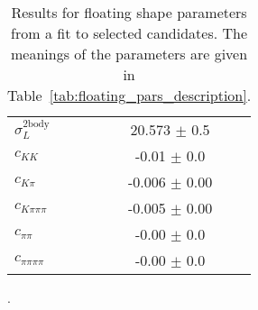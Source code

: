 \begin{table}[h]
\begin{tabular}{lc}
      $\sigma_L^\mathrm{2body}$ & 20.573 $\pm$ 0.5 \\
      $c_{KK}$ & -0.01 $\pm$ 0.0 \\
      $c_{K\pi}$ & -0.006 $\pm$ 0.00 \\
      $c_{K\pi\pi\pi}$ & -0.005 $\pm$ 0.00 \\
      $c_{\pi\pi}$ & -0.00 $\pm$ 0.0 \\
      $c_{\pi\pi\pi\pi}$ & -0.00 $\pm$ 0.0 \\
      \bottomrule
  \end{tabular}
  \caption{Results for floating shape parameters from a fit to selected candidates. The meanings of the parameters are given in Table~\ref{tab:floating_pars_description}.}.
\label{tab:floating_pars_shapes}
\end{table}
